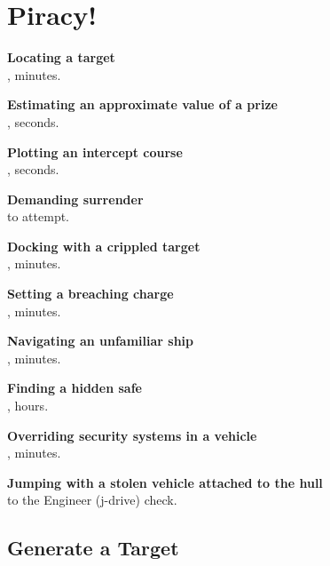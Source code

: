 \documentclass{cheatsheet}
\begin{document}
\section{Piracy!}

\begin{multicols}{2}
\begin{emphbox}
\textbf{Locating a target}\\
,  minutes.

\textbf{Estimating an approximate value of a prize}\\
,  seconds.

\textbf{Plotting an intercept course}\\
,  seconds.

\textbf{Demanding surrender}\\
 to attempt.

\textbf{Docking with a crippled target}\\
,  minutes.

\textbf{Setting a breaching charge}\\
,  minutes.

\textbf{Navigating an unfamiliar ship}\\
,  minutes.

\textbf{Finding a hidden safe}\\
,  hours.

\textbf{Overriding security systems in a vehicle}\\
,  minutes.

\textbf{Jumping with a stolen vehicle attached to the hull}\\
 to the Engineer (j-drive) check.
\end{emphbox}

\subsection{Generate a Target}


\end{multicols}
\end{document}
